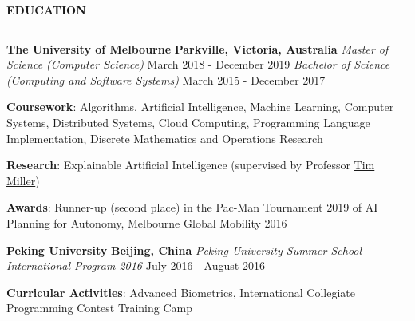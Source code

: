 \documentclass{cv}
\begin{document}
\smallskip


\textbf{\uppercase{Education}}
\sectionlineskip
\hrule height 0.6pt
\begin{list}{}{\setlength{\leftmargin}{0pt}}
\itemsep 2.0pt
\item
    \textbf{The University of Melbourne} \hfill \textbf{Parkville, Victoria, Australia}%
    \vspace{1.0pt} \newline
    {\textit{Master of Science (Computer Science)}} \hfill {March 2018 - December 2019}%
    \newline
    {\textit{Bachelor of Science (Computing and Software Systems)}} \hfill {March 2015 - December 2017}%
    \begin{list}{\raisebox{2.0pt}{\tiny$\bullet$}\space}{\setlength{\leftmargin}{11.2pt}}
        \itemsep -4.0pt \vspace{-4.0pt}
        \item \textbf{Coursework}: Algorithms, Artificial Intelligence, Machine Learning, Computer Systems, Distributed Systems, Cloud Computing, Programming Language Implementation, Discrete Mathematics and Operations Research
        \item \textbf{Research}: Explainable Artificial Intelligence (supervised by Professor \href{https://eecs.uq.edu.au/profile/9477/tim-miller}{Tim Miller})
        \item \textbf{Awards}: Runner-up (second place) in the Pac-Man Tournament 2019 of AI Planning for Autonomy, Melbourne Global Mobility 2016
    \end{list}
\item
    \textbf{Peking University} \hfill \textbf{Beijing, China}%
    \vspace{1.0pt} \newline 
    {\textit{Peking University Summer School International Program 2016}} \hfill {July 2016 - August 2016}%
    \begin{list}{\raisebox{2.0pt}{\tiny$\bullet$}\space}{\setlength{\leftmargin}{11.2pt}}
        \itemsep -4.0pt \vspace{-4.0pt}
        \item \textbf{Curricular Activities}: Advanced Biometrics, International Collegiate Programming Contest Training Camp
    \end{list}
\end{list}
\end{document}
